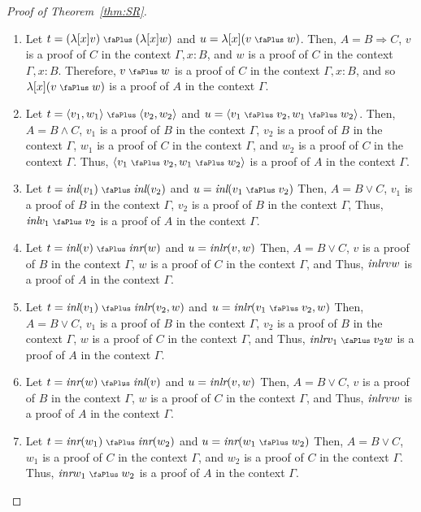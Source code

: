 \documentclass[screen, sigconf,authorversion,nonacm]{acmart}
\theoremstyle{acmdefinition}
\numberwithin{equation}{section}
\newcommand\abstr[1]{[#1]}
\newcommand\inl{\mbox{\it inl}}
\newcommand\inr{\mbox{\it inr}}
\newcommand\inlr{\mbox{\it inlr}}
\newcommand\plus{\mathrel{\text{\normalfont\scalebox{0.7}{\faPlus}}}}
\newcommand\pair[2]{\langle #1, #2 \rangle}
\begin{document}
\begin{proof}[Proof of Theorem~\ref{thm:SR}]
\begin{enumerate}
      that $\star$ is a proof of $\top$ in the context $\Gamma$.
    \item Let $t=(\lambda \abstr{x}v) \plus (\lambda \abstr{x}w)$ and $u=\lambda \abstr{x}(v \plus w)$.
      Then, $A=B\Rightarrow C$,
      $v$ is a proof of $C$ in the context $\Gamma,x:B$, and
      $w$ is a proof of $C$ in the context $\Gamma,x:B$.
      Therefore, $v\plus w$ is a proof of $C$ in the context $\Gamma,x:B$,
      and so $\lambda \abstr{x}(v \plus w)$ is a proof of $A$ in the context
      $\Gamma$.
    \item Let $t=\pair{v_1}{w_1} \plus \pair{v_2}{w_2}$ and $u=\pair{v_1\plus v_2}{w_1\plus w_2}$.
      Then, $A=B\wedge C$,
      $v_1$ is a proof of $B$ in the context $\Gamma$,
      $v_2$ is a proof of $B$ in the context $\Gamma$,
      $w_1$ is a proof of $C$ in the context $\Gamma$, and
      $w_2$ is a proof of $C$ in the context $\Gamma$.
      Thus, $\pair{v_1\plus v_2}{w_1\plus w_2}$ is a proof of $A$ in the context
      $\Gamma$.
    \item Let $t=\inl(v_1) \plus \inl(v_2)$ and $u=\inl(v_1\plus v_2)$
      Then, $A=B\vee C$,
      $v_1$ is a proof of $B$ in the context $\Gamma$,
      $v_2$ is a proof of $B$ in the context $\Gamma$,
      Thus, $\inl{v_1\plus v_2}$ is a proof of $A$ in the context $\Gamma$.
    \item Let $t=\inl(v) \plus \inr(w)$ and $u=\inlr(v,w) $
      Then, $A=B\vee C$,
      $v$ is a proof of $B$ in the context $\Gamma$,
      $w$ is a proof of $C$ in the context $\Gamma$, and
      Thus, $\inlr{v}{w}$ is a proof of $A$ in the context $\Gamma$.
    \item Let $t=\inl(v_1) \plus \inlr(v_2,w)$ and $u=\inlr(v_1 \plus v_2,w) $
      Then, $A=B\vee C$,
      $v_1$ is a proof of $B$ in the context $\Gamma$,
      $v_2$ is a proof of $B$ in the context $\Gamma$,
      $w$ is a proof of $C$ in the context $\Gamma$, and
      Thus, $\inlr{v_1\plus v_2}{w}$ is a proof of $A$ in the context $\Gamma$.
    \item Let $t=\inr(w) \plus \inl(v)$ and $u=\inlr(v,w)$
      Then, $A=B\vee C$,
      $v$ is a proof of $B$ in the context $\Gamma$,
      $w$ is a proof of $C$ in the context $\Gamma$, and
      Thus, $\inlr{v}{w}$ is a proof of $A$ in the context $\Gamma$.
    \item Let $t=\inr(w_1) \plus \inr(w_2)$ and $u=\inr(w_1 \plus w_2) $
      Then, $A=B\vee C$,
      $w_1$ is a proof of $C$ in the context $\Gamma$, and
      $w_2$ is a proof of $C$ in the context $\Gamma$.
      Thus, $\inr{w_1\plus w_2}$ is a proof of $A$ in the context $\Gamma$.

\end{enumerate}
\end{proof}
\end{document}
